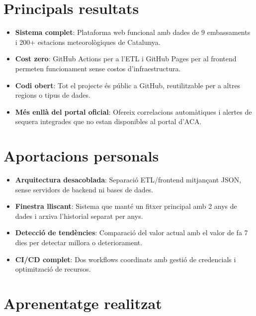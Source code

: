
\section{Principals resultats}

\begin{itemize}
    \item \textbf{Sistema complet}: Plataforma web funcional amb dades de 9 embassaments i 200+ estacions meteorològiques de Catalunya.
    \item \textbf{Cost zero}: GitHub Actions per a l'ETL i GitHub Pages per al frontend permeten funcionament sense costos d'infraestructura.
    \item \textbf{Codi obert}: Tot el projecte és públic a GitHub, reutilitzable per a altres regions o tipus de dades.
    \item \textbf{Més enllà del portal oficial}: Ofereix correlacions automàtiques i alertes de sequera integrades que no estan disponibles al portal d'ACA.
\end{itemize}


\section{Aportacions personals}

\begin{itemize}
    \item \textbf{Arquitectura desacoblada}: Separació ETL/frontend mitjançant JSON, sense servidors de backend ni bases de dades.
    \item \textbf{Finestra lliscant}: Sistema que manté un fitxer principal amb 2 anys de dades i arxiva l'historial separat per anys.
    \item \textbf{Detecció de tendències}: Comparació del valor actual amb el valor de fa 7 dies per detectar millora o deteriorament.
    \item \textbf{CI/CD complet}: Dos workflows coordinats amb gestió de credencials i optimització de recursos.
\end{itemize}


\section{Aprenentatge realitzat}

